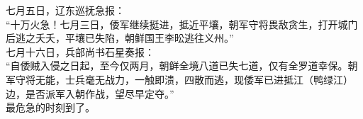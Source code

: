 \begin{multicols}{\theparacolNo}
七月五日，辽东巡抚急报：\\

“十万火急！七月三日，倭军继续挺进，抵近平壤，朝军守将畏敌贪生，打开城门后逃之夭夭，平壤已失陷，朝鲜国王李昖逃往义州。”\\

七月十六日，兵部尚书石星奏报：\\

“自倭贼入侵之日起，至今仅两月，朝鲜全境八道已失七道，仅有全罗道幸保。朝军守将无能，士兵毫无战力，一触即溃，四散而逃，现倭军已进抵江（鸭绿江）边，是否派军入朝作战，望尽早定夺。”\\

最危急的时刻到了。\\

\ifnum{}
	\end{multicols}
\fi
\newpage

